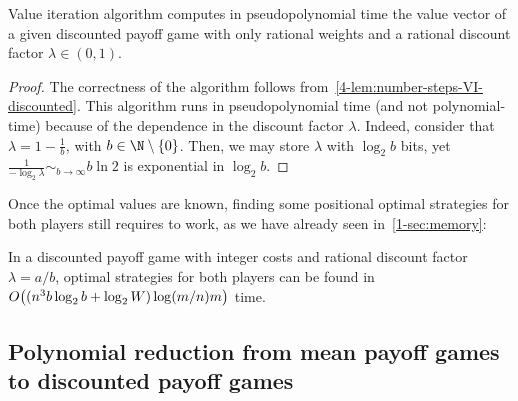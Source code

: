 \begin{theorem}\label{4-thm:DP-value-iteration}
  Value iteration algorithm computes in pseudopolynomial time the
  value vector of a given discounted payoff game with only rational
  weights and a rational discount factor $\lambda\in (0,1)$. 
\end{theorem}
\begin{proof}
  The correctness of the algorithm follows
  from~\cref{4-lem:number-steps-VI-discounted}.  This algorithm runs
  in pseudopolynomial time (and not polynomial-time) because of the
  dependence in the discount factor $\lambda$. Indeed, consider that
  $\lambda = 1-\frac 1 b$, with $b\in \N\setminus \{0\}$. Then, we may
  store $\lambda$ with $\log_2 b$ bits, yet
  $\frac 1{-\log_2\lambda} \sim_{b\to \infty} b\ln 2$ is exponential
  in $\log_2b$.
\end{proof}


Once the optimal values are known, finding some positional optimal
strategies for both players still requires to work, as we have already
seen in~\cref{1-sec:memory}:
\begin{theorem}\label{4-thm:DP-strategies}
  In a discounted payoff game with integer costs and rational discount
  factor $\lambda = a/b$, optimal strategies for both players can be
  found in
  $O\big((n^3b\log_2b + \log_2W)\allowbreak
  \log(m/n) m\big)$ time.
\end{theorem}

\subsection*{Polynomial reduction from mean payoff games to discounted payoff games}\label{4-sec:mean_payoff-values}


